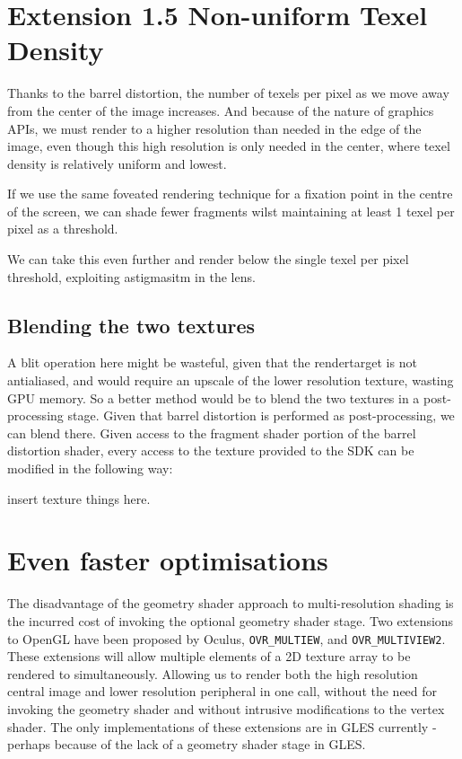 \documentclass[12pt,a4paper,twoside,openright]{report}
\begin{document}
\section{Extension 1.5 Non-uniform Texel Density}

Thanks to the barrel distortion, the number of texels per pixel as we move away from the center of the image increases. And because of the nature of graphics APIs, we must render to a higher resolution than needed in the edge of the image, even though this high resolution is only needed in the center, where texel density is relatively uniform and lowest.

If we use the same foveated rendering technique for a fixation point in the centre of the screen, we can shade fewer fragments wilst maintaining at least 1 texel per pixel as a threshold.

We can take this even further and render below the single texel per pixel threshold, exploiting astigmasitm in the lens.

\subsection{Blending the two textures}

A blit operation here might be wasteful, given that the rendertarget is not antialiased, and would require an upscale of the lower resolution texture, wasting GPU memory. So a better method would be to blend the two textures in a post-processing stage. Given that barrel distortion is performed as post-processing, we can blend there. Given access to the fragment shader portion of the barrel distortion shader, every access to the texture provided to the SDK can be modified in the following way:

\begin{blockcode}
insert texture things here.
\end{blockcode}

\section{Even faster optimisations}

The disadvantage of the geometry shader approach to multi-resolution shading is the incurred cost of invoking the optional geometry shader stage.
Two extensions to OpenGL have been proposed by Oculus, \texttt{OVR\_MULTIEW}, and \texttt{OVR\_MULTIVIEW2}. These extensions will allow multiple elements of a 2D texture array to be rendered to simultaneously. Allowing us to render both the high resolution central image and lower resolution peripheral in one call, without the need for invoking the geometry shader and without intrusive modifications to the vertex shader. The only implementations of these extensions are in GLES currently - perhaps because of the lack of a geometry shader stage in GLES.
\end{document}
